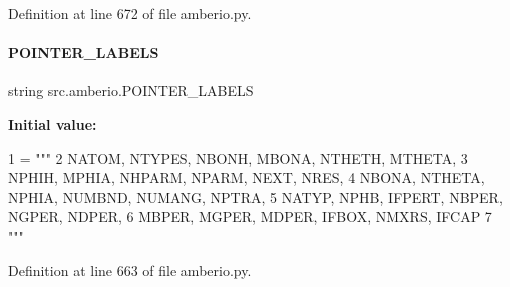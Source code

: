Definition at line 672 of file amberio.\+py.

\mbox{\label{namespacesrc_1_1amberio_a310fef0f53ae182324b5e25efe513646}} 
\paragraph{\texorpdfstring{P\+O\+I\+N\+T\+E\+R\+\_\+\+L\+A\+B\+E\+LS}{POINTER\_LABELS}}
{\footnotesize\ttfamily string src.\+amberio.\+P\+O\+I\+N\+T\+E\+R\+\_\+\+L\+A\+B\+E\+LS}

{\bfseries Initial value\+:}
\begin{DoxyCode}
1 =  \textcolor{stringliteral}{"""}
2 \textcolor{stringliteral}{              NATOM,  NTYPES, NBONH,  MBONA,  NTHETH, MTHETA,}
3 \textcolor{stringliteral}{              NPHIH,  MPHIA,  NHPARM, NPARM,  NEXT,   NRES,}
4 \textcolor{stringliteral}{              NBONA,  NTHETA, NPHIA,  NUMBND, NUMANG, NPTRA,}
5 \textcolor{stringliteral}{              NATYP,  NPHB,   IFPERT, NBPER,  NGPER,  NDPER,}
6 \textcolor{stringliteral}{              MBPER,  MGPER,  MDPER,  IFBOX,  NMXRS,  IFCAP}
7 \textcolor{stringliteral}{"""}
\end{DoxyCode}


Definition at line 663 of file amberio.\+py.

